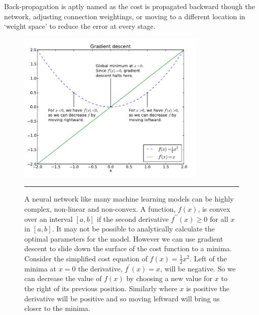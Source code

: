 Back-propagation is aptly named as the cost is propagated backward though the network, adjusting connection weightings, or moving to a different location in `weight space' to reduce the error at every stage.
\begin{figure}[htbp]
	\centering
		\includegraphics[width = 0.8\textwidth]{./Figures/gradient_descent_DL_textbook_8.jpg}
		\rule{35em}{0.5pt}
	\caption[Gradient Descent]{A neural network like many machine learning models can be highly complex, non-linear and non-convex. 
A function, $f(x)$, is convex over an interval $[a, b]$ if the second derivative $f^{\prime \prime}(x) \geq  0$ for all $x$ in $[a, b]$.
It may not be possible to analytically calculate the optimal parameters for the model. However we can use gradient descent to slide down the surface of the cost function to a minima. Consider the simplified cost equation of $f(x) = \frac{1}{2}x^2$. Left of the minima at $x = 0$ the derivative, $f^\prime(x) = x$, will be negative. So we can decrease the value of $f(x)$ by choosing a new value for $x$ to the right of its previous position. Similarly where $x$ is positive the derivative will be positive and so moving leftward will bring us closer to the minima.}
	\label{fig:Gradient_descent}
\end{figure}
